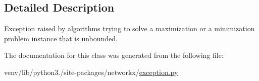 \subsection{Detailed Description}
\begin{DoxyVerb}Exception raised by algorithms trying to solve a maximization
or a minimization problem instance that is unbounded.\end{DoxyVerb}
 

The documentation for this class was generated from the following file\+:\begin{DoxyCompactItemize}
\item 
venv/lib/python3./site-\/packages/networkx/\hyperlink{exception_8py}{exception.\+py}\end{DoxyCompactItemize}
